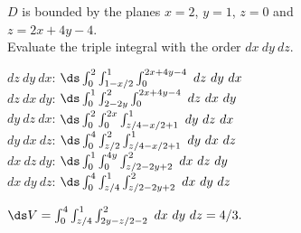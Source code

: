 {\label{13_06_ex_11}$D$ is bounded by the planes $x=2$, $y=1$,  $z=0$ and \\
 $z=2x+4y-4$.\\

Evaluate the triple integral with the order $dx\ dy\ dz$.

}
{$dz\ dy\ dx$: $\ds\int_0^2\int_{1-x/2}^{1}\int_{0}^{2x+4y-4}\ dz\ dy\ dx$\\
	$dz\ dx\ dy$: $\ds\int_{0}^1\int_{2-2y}^{2}\int_{0}^{2x+4y-4}\ dz\ dx\ dy$\\
	$dy\ dz\ dx$: $\ds\int_0^2\int_0^{2x}\int_{z/4-x/2+1}^{1}\ dy\ dz\ dx$\\
	$dy\ dx\ dz$: $\ds\int_0^4\int_{z/2}^{2}\int_{z/4-x/2+1}^{1}\ dy\ dx\ dz$\\
	$dx\ dz\ dy$: $\ds\int_{0}^1\int_{0}^{4y}\int_{z/2-2y+2}^2\ dx\ dz\ dy$\\
	$dx\ dy\ dz$: $\ds\int_0^4\int_{z/4}^{1}\int_{z/2-2y+2}^2\ dx\ dy\ dz$
	
	$\ds V = \int_0^4\int_{z/4}^{1}\int_{2y-z/2-2}^2\ dx\ dy\ dz = 4/3.$
}
